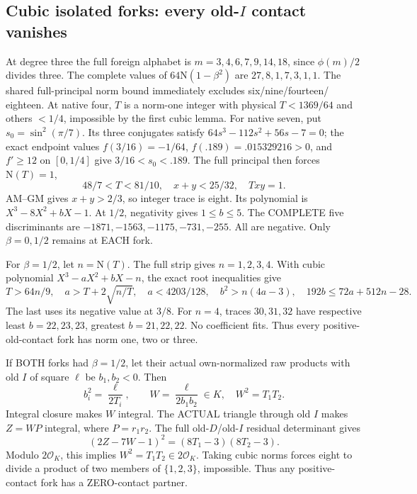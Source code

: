 \documentclass[11pt]{article}
\begin{document}
\subsection[Cubic isolated forks: every old-I contact vanishes]{Cubic isolated forks: every old-\(I\) contact vanishes}
\label{app:arithD16Icubiccontacts}

At degree three the full foreign
alphabet is \(m=3,4,6,7,9,14,18\),
since \(\phi(m)/2\) divides three.
The complete values of
\(64\mathrm N(1-\beta^2)\) are
\(27,8,1,7,3,1,1\).
The shared full-principal norm bound
immediately excludes six/nine/fourteen/
eighteen.
At native four, \(T\) is a norm-one
integer with physical \(T<1369/64\)
and others \(<1/4\), impossible by
the first cubic lemma.
For native seven, put
\(s_0=\sin^2(\pi/7)\).
Its three conjugates satisfy
\(64s^3-112s^2+56s-7=0\);
the exact endpoint values
\(f(3/16)=-1/64\),
\(f(.189)=.015329216>0\),
and \(f'\ge12\) on \([0,1/4]\)
give \(3/16<s_0<.189\).
The full principal then forces
\(\mathrm N(T)=1\),
\[
                48/7<T<81/10,\quad
                x+y<25/32,\quad Txy=1 .
\]
AM--GM gives \(x+y>2/3\), so
integer trace is eight.
Its polynomial is \(X^3-8X^2+bX-1\).
At \(1/2\), negativity gives \(1\le b\le5\).
The COMPLETE five discriminants are
\(-1871,-1563,-1175,-731,-255\).
All are negative.
Only \(\beta=0,1/2\) remains at EACH fork.

For \(\beta=1/2\), let \(n=\mathrm N(T)\).
The full strip gives \(n=1,2,3,4\).
With cubic polynomial \(X^3-aX^2+bX-n\),
the exact root inequalities give
\[
 T>64n/9,\quad a>T+2\sqrt{n/T},\quad
 a<4203/128,\quad b^2>n(4a-3),\quad
                         192b\le72a+512n-28 .
\]
The last uses its negative value at
\(3/8\).
For \(n=4\), traces \(30,31,32\)
have respective least \(b=22,23,23\),
greatest \(b=21,22,22\).
No coefficient fits.
Thus every positive-old-contact fork
has norm one, two or three.

If BOTH forks had \(\beta=1/2\),
let their actual own-normalized raw
products with old \(I\) of square
\(\ell\) be \(b_1,b_2<0\).
Then
\[
 b_i^2={\frac{\ell}{2T_i}},\qquad
 W={\frac{\ell}{2b_1b_2}}\in K,\quad W^2=T_1T_2 .
\]
Integral closure makes \(W\) integral.
The ACTUAL triangle through old \(I\)
makes \(Z=WP\) integral, where
\(P=r_1r_2\).
The full old-\(D\)/old-\(I\) residual
determinant gives
\[
                         (2Z-7W-1)^2=(8T_1-3)(8T_2-3).
\]
Modulo \(2\mathcal O_K\), this implies
\(W^2=T_1T_2\in2\mathcal O_K\).
Taking cubic norms forces eight to
divide a product of two members of
\(\{1,2,3\}\), impossible.
Thus any positive-contact fork has
a ZERO-contact partner.
\end{document}
